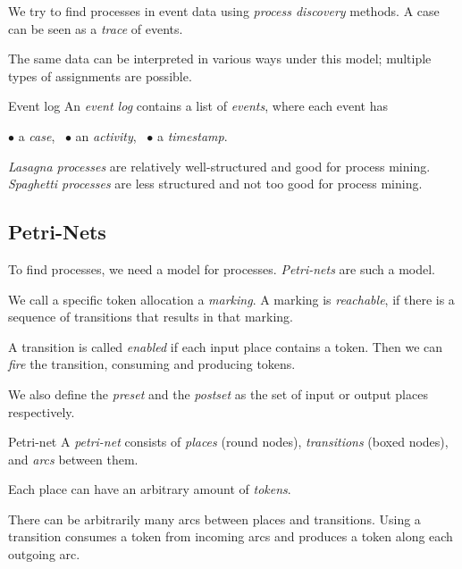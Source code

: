 \documentclass[english]{panikzettel}
\begin{document}
\begin{halfboxl}
We try to find processes in event data using \emph{process discovery} methods.
A case can be seen as a \emph{trace} of events.

The same data can be interpreted in various ways under this model; multiple types of assignments are possible.
\end{halfboxl}%
\begin{halfboxr}
\vspace{-\baselineskip}
\begin{defi}{Event log}
An \emph{event log} contains a list of \emph{events}, where each event has
\begin{tightcenter}
$\bullet$ a \emph{case},~ $\bullet$ an \emph{activity},~ $\bullet$ a \emph{timestamp}.
\end{tightcenter}
\end{defi}
\end{halfboxr}

\emph{Lasagna processes} are relatively well-structured and good for process mining.
\emph{Spaghetti processes} are less structured and not too good for process mining.

\subsection{Petri-Nets}

\begin{halfboxl}
To find processes, we need a model for processes.
\emph{Petri-nets} are such a model.

We call a specific token allocation a \emph{marking}.
A marking is \emph{reachable}, if there is a sequence of transitions that results in that marking.

A transition is called \emph{enabled} if each input place contains a token.
Then we can \emph{fire} the transition, consuming and producing tokens.

We also define the \emph{preset} and the \emph{postset} as the set of input or output places respectively.
\end{halfboxl}%
\begin{halfboxr}
\vspace{-\baselineskip}
\begin{defi}{Petri-net}
A \emph{petri-net} consists of \emph{places} (round nodes), \emph{transitions} (boxed nodes), and \emph{arcs} between them.

Each place can have an arbitrary amount of \emph{tokens}.

There can be arbitrarily many arcs between places and transitions.
Using a transition consumes a token from incoming arcs and produces a token along each outgoing arc.
\end{defi}
\end{halfboxr}
\end{document}
